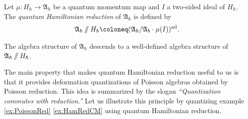 \begin{definition}
	Let $\mu \colon H_\hbar \to \mathfrak{A}_\hbar$ be a quantum momentum map and $I$ a two-sided ideal of $H_\hbar$. The \emph{quantum Hamiltonian reduction} of $\mathfrak{A}_\hbar$ is defined by
	\begin{equation}
		\mathfrak{A}_\hbar \hred H_\hbar \coloneq (\mathfrak{A}_\hbar / \mathfrak{A}_\hbar \cdot \mu(I))^{\operatorname{ad}}.
	\end{equation}
\end{definition}

\begin{prop}
	The algebra structure of $\mathfrak{A}_\hbar$ descends to a well-defined algebra structure of $\mathfrak{A}_\hbar \mathbin{/\!\!/} H_\hbar$.
\end{prop}

The main property that makes quantum Hamiltonian reduction useful to us is that it provides deformation quantizations of Poisson algebras obtained by Poisson reduction. This idea is summarized by the slogan \emph{``Quantization commutes with reduction.''} Let us illustrate this principle by quantizing example \ref{ex:PoissonRed} \ref{ex:HamRedCM} using quantum Hamiltonian reduction.

